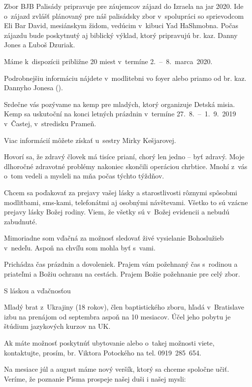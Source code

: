 Zbor BJB Palisády pripravuje pre záujemcov zájazd do Izraela na jar 2020. Ide o~zájazd zvlášť plánovaný pre náš palisádsky zbor v~spolupráci so sprievodcom Eli Bar David, mesiánskym židom, vedúcim v~kibuci Yad HaShmobna. Počas zájazdu bude poskytnutý aj biblický výklad, ktorý pripravujú br. kaz. Danny Jones a Ľuboš Dzuriak.

Máme k~dispozícii približne 20 miest v~termíne 2.~--~8.~marca~2020.

Podrobnejšiu informáciu nájdete v~modlitebni vo foyer alebo priamo od br. kaz. Dannyho Jonesa ().


Srdečne vás pozývame na kemp pre mladých, ktorý organizuje Detská misia. Kemp sa uskutoční na konci letných prázdnin v~termíne 27.~8.~--~1.~9.~2019 v~Častej, v~stredisku Prameň.

Viac informácií môžete získať u~sestry Mirky Kešjarovej.


Hovorí sa, že zdravý človek má tisíce prianí, chorý len jedno -- byť zdravý. Moje  dlhoročné zdravotné problémy nakoniec skončili operáciou chrbtice. Mnohí z~vás o~tom vedeli a mysleli na mňa počas týchto týždňov.

Chcem sa poďakovať za prejavy vašej lásky a starostlivosti rôznymi spôsobmi modlitbami, sms-kami, telefonátmi aj osobnými návštevami. Všetko to sú vzácne prejavy lásky Božej rodiny. Viem, že všetky sú v~Božej evidencii a nebudú zabudnuté.

Mimoriadne som vďačná za možnosť sledovať živé vysielanie Bohoslužieb v~nedeľu. Aspoň na chvíľu som mohla byť s~vami.

Prichádza čas prázdnin a dovoleniek. Prajem vám požehnaný čas s~rodinou a priateľmi a Božiu ochranu na cestách. Prajem Božie požehnanie pre celý zbor.

S láskou a vďačnosťou



Mladý brat z~Ukrajiny (18 rokov), člen baptistického zboru, hľadá v~Bratislave izbu na prenájom od septembra aspoň na 10 mesiacov. Účel jeho pobytu je štúdium jazykových kurzov na UK.

Ak máte možnosť poskytnúť ubytovanie alebo o~takej možnosti viete, kontaktujte, prosím, br. Viktora Potockého na tel. 0919~285~654.
\vfill\break


Na mesiace júl a august máme nový veršík, ktorý sa chceme spoločne učiť. Veríme, že poznanie Písma prospeje našej duši i našej mysli:

